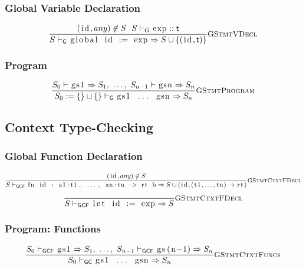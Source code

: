 \documentclass{article}
\newcommand{\code}[1]{\lstinline[columns=fixed]{#1}}
\newcommand{\drmrule}[5]{\frac{#1}{#2\vdash_{\mathsf{#3}}#4}\textsc{\small{#5}}}
\begin{document}
			\subsubsection{Global Variable Declaration}
			
				\begin{align*}
					\drmrule{(\textnormal{\code{id}},any) \not\in S\ \ S\vdash_G\textnormal{\code{exp}} :: \mathsf{t}}{S}{G}{\textnormal{\code{global id := exp}} \Rightarrow S\cup\{(\textnormal{\code{id}},\mathsf{t})\}}{GStmtVDecl}
				\end{align*}
			
			\subsubsection{Program}
			
				\begin{align*}
					\drmrule{S_0 \vdash \textnormal{\code{gs1}} \Rightarrow S_1,\ \dots,\ S_{n-1} \vdash \textnormal{\code{gsn}} \Rightarrow S_n}{S_0 := \{\} \sqcup \{\}}{G}{\textnormal{\code{gs1 ... gsn}} \Rightarrow S_n}{GStmtProgram}
				\end{align*}
				
		\subsection{Context Type-Checking}
		
			\subsubsection{Global Function Declaration}
			
				\begin{align*}
					\drmrule{(\textnormal{\code{id}},any) \not\in S}{S}{GCF}{\textnormal{\code{fn id : a1:t1, ..., an:tn -> rt b}} \Rightarrow S \cup (\textnormal{\code{id}}, (\textnormal{\code{t1}},\dots,\textnormal{\code{tn}}) \to \textnormal{\code{rt}})}{GStmtCtxtFDecl}
				\end{align*}\begin{align*}
					\drmrule{}{S}{GCF}{\textnormal{\code{let id := exp}} \Rightarrow S}{GStmtCtxtFDecl}
				\end{align*}
			
			\subsubsection{Program: Functions}
			
				\begin{align*}
					\drmrule{S_0 \vdash_{\mathsf{GCF}} \textnormal{\code{gs1}} \Rightarrow S_1,\ \dots,\ S_{n-1} \vdash_{\mathsf{GCF}} \textnormal{\code{gs(n-1)}} \Rightarrow S_n}{S_0}{GC}{\textnormal{\code{gs1 ... gsn}} \Rightarrow S_n}{GStmtCtxtFuncs}
				\end{align*}
			
\end{document}

